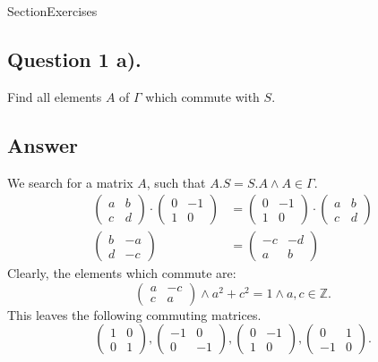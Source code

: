 Section{Exercises}

\subsection{Question 1 a).}
\noindent
Find all elements $A$ of $\Gamma$ which commute with $S$.

\subsection*{Answer}
\noindent
We search for a matrix $A$, such that $A.S = S.A \wedge A \in \Gamma$.
\begin{align*}
    \begin{pmatrix}
        a & b\\
        c & d
    \end{pmatrix} \cdot
    \begin{pmatrix}
        0 & -1\\
        1 & 0
    \end{pmatrix}
    &=
    \begin{pmatrix}
        0 & -1\\
        1 & 0
    \end{pmatrix} \cdot
    \begin{pmatrix}
        a & b\\
        c & d
    \end{pmatrix} \\
    \begin{pmatrix}
        b & -a\\
        d & -c
    \end{pmatrix}
    &=
    \begin{pmatrix}
        -c & -d\\
        a & b
    \end{pmatrix}
\end{align*}
Clearly, the elements which commute are:
\[
    \begin{pmatrix}
        a & -c\\
        c & a
    \end{pmatrix}
    \wedge a^2 + c^2 = 1 \wedge a,c \in \mathbb{Z}.
\]
This leaves the following commuting matrices.
\[
    \begin{pmatrix}
        1 & 0\\
        0 & 1
    \end{pmatrix},
    \begin{pmatrix}
        -1 & 0\\
        0 & -1
    \end{pmatrix},
    \begin{pmatrix}
        0 & -1\\
        1 & 0
    \end{pmatrix},
    \begin{pmatrix}
        0 & 1\\
        -1 & 0
    \end{pmatrix}.
\]



